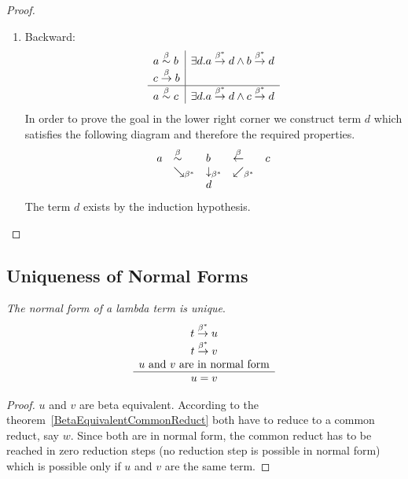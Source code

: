 \begin{theorem}
\begin{proof}
\begin{enumerate}
            \item Backward:
            $$
            \begin{array}{l|l}
                a \stackrel{\beta}{\sim} b
                &
                \exists d. a \stackrel{\beta^*}{\to} d \land b \stackrel{\beta^*}{\to} d
                \\
                c \stackrel{\beta}{\to} b
                \\
                \hline
                a \stackrel{\beta}{\sim} c
                &
                \exists d. a \stackrel{\beta^*}{\to} d \land c \stackrel{\beta^*}{\to} d
            \end{array}
            $$
            In order to prove the goal in the lower right corner we construct
            term $d$ which satisfies the following diagram and therefore the
            required properties.
            $$
            \begin{array}{lllll}
                a
                &\stackrel{\beta}{\sim}
                &b
                &\stackrel{\beta}{\leftarrow}
                &c
                \\
                &\searrow_{\beta^*}
                &\downarrow_{\beta^*}
                &\swarrow_{\beta^*}
                \\
                &
                &d
            \end{array}
            $$
            The term $d$ exists by the induction hypothesis.
        \end{enumerate}
    \end{proof}
\end{theorem}




\subsection{Uniqueness of Normal Forms}

\begin{theorem}
    \label{NormalFormUnique}
    \emph{The normal form of a lambda term is unique}.
    $$
    \begin{array}{c} 
        t \stackrel{\beta^*}{\to} u
        \\
        t \stackrel{\beta^*}{\to} v
        \\
        \text{$u$ and $v$ are in normal form}
     \\ \hline 
        u = v
    \end{array}
    $$

    \begin{proof}
        $u$ and $v$ are beta equivalent. According to the
        theorem~\ref{BetaEquivalentCommonReduct} both have to reduce to a common
        reduct, say $w$. Since both are in normal form, the common reduct has to
        be reached in zero reduction steps (no reduction step is possible in
        normal form) which is possible only if $u$ and $v$ are the same term.
    \end{proof}
\end{theorem}





